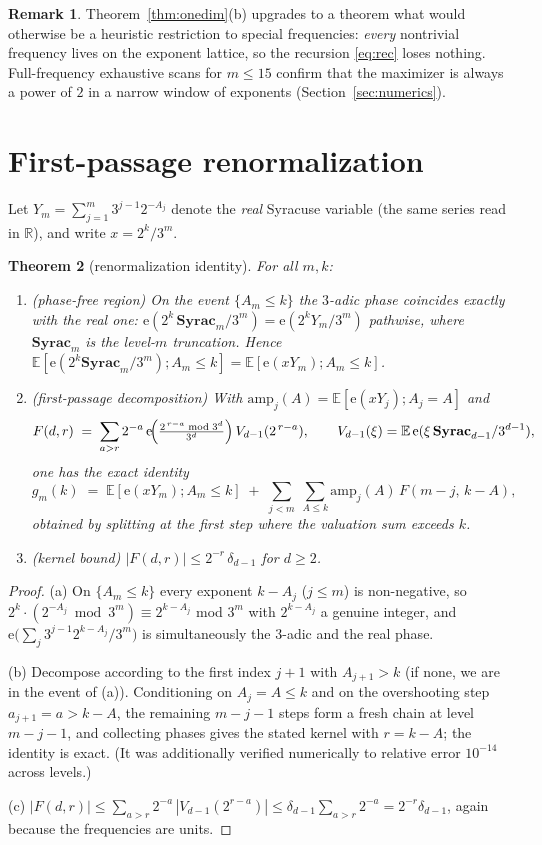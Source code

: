 \documentclass[11pt]{article}
\newtheorem{theorem}{Theorem}[section]
\theoremstyle{definition}
\newtheorem{remark}[theorem]{Remark}
\newcommand{\R}{\mathbb{R}}
\newcommand{\E}{\mathbb{E}}
\newcommand{\e}{\mathrm{e}}
\begin{document}
\begin{remark}
Theorem~\ref{thm:onedim}(b) upgrades to a theorem what would otherwise be
a heuristic restriction to special frequencies: \emph{every} nontrivial
frequency lives on the exponent lattice, so the recursion
\eqref{eq:rec} loses nothing. Full-frequency exhaustive scans for
$m\le 15$ confirm that the maximizer is always a power of $2$ in a
narrow window of exponents (Section~\ref{sec:numerics}).
\end{remark}

\section{First-passage renormalization}\label{sec:renorm}

Let $Y_m=\sum_{j=1}^m 3^{j-1}2^{-A_j}$ denote the \emph{real} Syracuse
variable (the same series read in $\R$), and write $x=2^k/3^m$.

\begin{theorem}[renormalization identity]\label{thm:renorm}
For all $m,k$:
\begin{enumerate}
\item[(a)] (phase-free region) On the event $\{A_m\le k\}$ the $3$-adic
  phase coincides exactly with the real one:
  $\e(2^k\,\mathbf{Syrac}_m/3^m)=\e(2^k Y_m/3^m)$ pathwise, where
  $\mathbf{Syrac}_m$ is the level-$m$ truncation. Hence
  $\E[\e(2^k\mathbf{Syrac}_m/3^m);A_m\le k]=\E[\e(xY_m);A_m\le k]$.
\item[(b)] (first-passage decomposition) With
  $\mathrm{amp}_j(A)=\E[\e(xY_j); A_j=A]$ and
  \[
  F(d,r)\;=\;\sum_{a>r}2^{-a}\,
  \e\!\Bigl(\tfrac{2^{\,r-a}\bmod 3^d}{3^d}\Bigr)\,V_{d-1}(2^{\,r-a}),
  \qquad V_{d-1}(\xi)=\E\,\e(\xi\,\mathbf{Syrac}_{d-1}/3^{d-1}),
  \]
  one has the exact identity
  \[
  g_m(k)\;=\;\E[\e(xY_m);A_m\le k]\;+\;
  \sum_{j<m}\ \sum_{A\le k}\mathrm{amp}_j(A)\,F(m-j,\,k-A),
  \]
  obtained by splitting at the first step where the valuation sum
  exceeds $k$.
\item[(c)] (kernel bound) $|F(d,r)|\le 2^{-r}\,\delta_{d-1}$ for $d\ge 2$.
\end{enumerate}
\end{theorem}

\begin{proof}
(a) On $\{A_m\le k\}$ every exponent $k-A_j$ ($j\le m$) is non-negative,
so $2^{k}\cdot(2^{-A_j}\bmod 3^m)\equiv 2^{k-A_j}$ mod $3^m$ with
$2^{k-A_j}$ a genuine integer, and
$\e\bigl(\sum_j 3^{j-1}2^{k-A_j}/3^m\bigr)$ is simultaneously the
$3$-adic and the real phase.

(b) Decompose according to the first index $j+1$ with $A_{j+1}>k$
(if none, we are in the event of (a)). Conditioning on $A_j=A\le k$ and
on the overshooting step $a_{j+1}=a>k-A$, the remaining $m-j-1$ steps
form a fresh chain at level $m-j-1$, and collecting phases gives the
stated kernel with $r=k-A$; the identity is exact. (It was additionally
verified numerically to relative error $10^{-14}$ across levels.)

(c) $|F(d,r)|\le\sum_{a>r}2^{-a}\,|V_{d-1}(2^{r-a})|
\le \delta_{d-1}\sum_{a>r}2^{-a}=2^{-r}\delta_{d-1}$, again because the
frequencies are units.
\end{proof}
\end{document}

